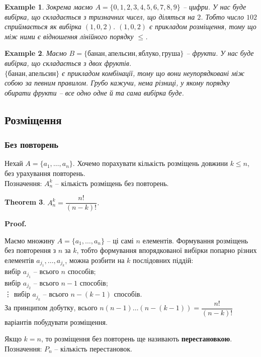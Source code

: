 \documentclass[a4paper, 14pt]{extarticle}
\makeatletter
\theoremstyle{theoremdd}
\newtheorem{theorem}{Theorem}[subsection]
\theoremstyle{theoremdd}
\theoremstyle{theoremdd}
\theoremstyle{theoremdd}
\theoremstyle{theoremdd}
\newtheorem{example}[theorem]{Example}
\theoremstyle{theoremdd}
\theoremstyle{theoremdd}
\theoremstyle{theoremdd}
\theoremstyle{theoremdd}
\theoremstyle{theoremdd}
\theoremstyle{theoremdd}
\theoremstyle{theoremdd}
\theoremstyle{theoremdd}
\theoremstyle{theoremdd}
\theoremstyle{theoremdd}
\renewenvironment{proof}[1][Proof.\\]{\par
\pushQED{\hfill \qed}%
\normalfont \topsep6\p@\@plus6\p@\relax
\trivlist
\item\relax
{\bfseries
#1\@addpunct{.}}\hspace\labelsep\ignorespaces
}{%
\popQED\endtrivlist\@endpefalse
}
\makeatother
\begin{document}
\begin{example}
Зокрема маємо $A = \{0,1,2,3,4,5,6,7,8,9\}$ -- цифри. У нас буде вибірка, що складається з тризначних чисел, що діляться на $2$. Тобто число $102$ сприймається як вибірка $(1,0,2)$.
$(1,0,2)$ є прикладом розміщення, тому що між ними є відношення лінійного порядку $\leq$.
\end{example}

\begin{example}
Маємо $B = \{\text{банан},\text{апельсин},\text{яблуко},\text{груша}\}$ -- фрукти. У нас буде вибірка, що складається з двох фруктів.\\
$\{ \text{банан}, \text{апельсин} \}$ є прикладом комбінації, тому що вони неупорядковані між собою за певним правилом. Грубо кажучи, нема різниці, у якому порядку обирати фрукти -- все одно одне й та сама вибірка буде.
\end{example}

\subsection{Розміщення}
\subsubsection*{Без повторень}
Нехай $A = \{a_1,\dots,a_n\}$. Хочемо порахувати кількість розміщень довжини $k \leq n$, без урахування повторень.\\
Позначення: $A_n^k$ -- кількість розміщень без повторень.

\begin{theorem}
$A_n^k = \dfrac{n!}{(n-k)!}$.
\end{theorem}

\begin{proof}
Маємо множину $A = \{a_1,\dots,a_n\}$ -- ці самі $n$ елементів. Формування розміщень без повторення з $n$ за $k$, тобто формування впорядкованої вибірки попарно різних елементів $a_{j_1},\dots,a_{j_k}$, можна розбити на $k$ послідовних піддій: \\
вибір $a_{j_1}$ -- всього $n$ способів;\\
вибір $a_{j_2}$ -- всього $n-1$ способів;\\
\vdots
вибір $a_{j_k}$ -- всього $n-(k-1)$ способів.\\
За принципом добутку, всього $n (n-1) \dots (n-(k-1)) = \dfrac{n!}{(n-k)!}$ варіантів побудувати розміщення.
\end{proof}

Якщо $k = n$, то розміщення без повторень ще називають \textbf{перестановкою}. \\
Позначення: $P_n$ -- кількість перестановок.
\end{document}
